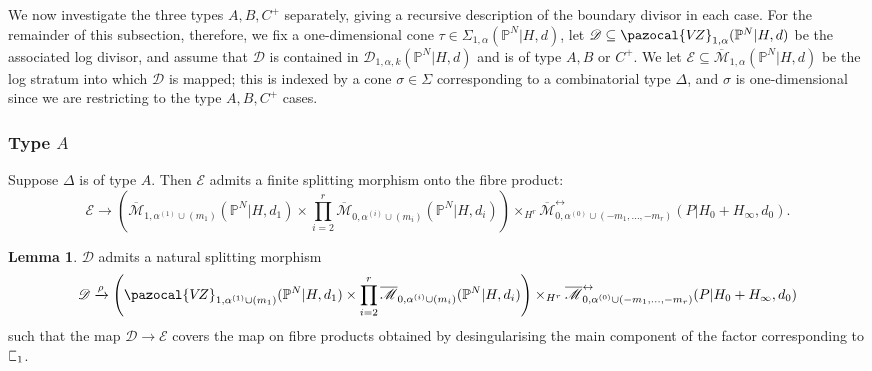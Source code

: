 \documentclass[11pt]{amsart}
\newcommand{\sqC}{\scalebox{0.8}[1.3]{$\sqsubset$}}
\newcommand{\PP}{\mathbb P}
\newcommand{\VZ}{\pazocal{V\!Z}}
\renewcommand{\to}{\rightarrow}
\newcommand{\Mcal}{\mathcal{M}}
\newcommand{\Dcal}{\mathcal{D}}
\newcommand{\Ecal}{\mathcal{E}}
\newcommand{\ol}[1]{\overline{#1}}
\theoremstyle{definition}
\newtheorem{lemma}[thm]{Lemma}
\theoremstyle{definition}
\begin{document}
We now investigate the three types $A,B,C^+$ separately, giving a recursive description of the boundary divisor in each case. For the remainder of this subsection, therefore, we fix a one-dimensional cone $\tau \in \Sigma_{1,\alpha}(\PP^N|H,d)$, let $\Dcal \subseteq \VZ_{1,\alpha}(\PP^N|H,d)$ be the associated log divisor, and assume that $\Dcal$ is contained in $\Dcal_{1,\alpha,k}(\PP^N|H,d)$ and is of type $A,B$ or $C^+$. We let $\Ecal \subseteq \ol\Mcal_{1,\alpha}(\PP^N|H,d)$ be the log stratum into which $\Dcal$ is mapped; this is indexed by a cone $\sigma \in \Sigma$ corresponding to a combinatorial type $\Delta$, and $\sigma$ is one-dimensional since we are restricting to the type $A,B,C^+$ cases.


\subsubsection{Type $A$}\label{subsubsection type A} Suppose $\Delta$ is of type $A$. Then $\Ecal$ admits a finite splitting morphism onto the fibre product:
\begin{equation*} \Ecal \to \left( \ol\Mcal_{1,\alpha^{(1)}\cup(m_1)}(\PP^N|H,d_1) \times \prod_{i=2}^r \ol\Mcal_{0,\alpha^{(i)}\cup(m_i)}(\PP^N|H,d_i) \right) \times_{H^r} \ol\Mcal^{\leftrightarrow}_{0,\alpha^{(0)}\cup (-m_1,\ldots,-m_r)}(P|H_0+H_\infty,d_0).\end{equation*}

\begin{lemma} \label{Lemma type A gluing} $\Dcal$ admits a natural splitting morphism
\begin{equation*}\Dcal \xrightarrow{\rho} \left(\VZ_{1,\alpha^{(1)}\cup(m_1)}(\PP^N|H,d_1)\times\prod_{i=2}^r \ol\Mcal_{0,\alpha^{(i)}\cup(m_i)}(\PP^N|H,d_i)\right) \times_{H^r} \ol\Mcal^{\leftrightarrow}_{0,\alpha^{(0)}\cup (-m_1,\ldots,-m_r)}(P|H_0+H_\infty,d_0)\end{equation*}
such that the map $\Dcal \to \Ecal$ covers the map on fibre products obtained by desingularising the main component of the factor corresponding to $\sqC_1$.\end{lemma}
\end{document}
